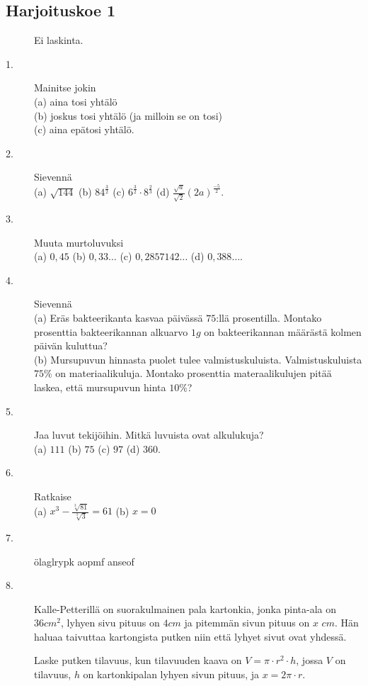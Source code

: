 \subsection*{Harjoituskoe 1}


\begin{description}
	\item[] Ei laskinta.
	\item[1.] Mainitse jokin \\
	(a) aina tosi yhtälö \\
	(b) joskus tosi yhtälö (ja milloin se on tosi) \\
	(c) aina epätosi yhtälö.
	\item[2.] Sievennä \\
	(a) $\sqrt{144}$ \qquad
	(b) $84^\frac{3}{2}$ \qquad
	(c) $ 6^\frac{3}{2}\cdot 8^\frac{2}{3} $ \qquad
	(d) $\frac{\sqrt{a}}{\sqrt{2}}(2a)^{\frac{-5}{2}}$.
	\item[3.] Muuta murtoluvuksi \\
	(a) $0,45$ \qquad
	(b) $0,33\ldots$ \qquad
	(c) $0,2857142\ldots$ \qquad
	(d) $0,388\ldots$.
	\item[4.] Sievennä \\
	(a) Eräs bakteerikanta kasvaa päivässä $75$:llä prosentilla. Montako prosenttia bakteerikannan alkuarvo $1 g$ on bakteerikannan määrästä kolmen päivän kuluttua? \\
	(b) Mursupuvun hinnasta puolet tulee valmistuskuluista. Valmistuskuluista $75\%$ on materiaalikuluja. Montako prosenttia materaalikulujen pitää laskea, että mursupuvun hinta $10\%$? \qquad
	\item[5.] Jaa luvut tekijöihin. Mitkä luvuista ovat alkulukuja? \\
	(a) $111$ \qquad
	(b) $75$ \qquad
	(c) $97$ \qquad
	(d) $360$.
	\item[6.] Ratkaise \\
	(a) $x^3 - \frac{\sqrt[3]{81}}{\sqrt[3]{3}} = 61$ \qquad
	(b) $x=0$
	\item[7.] ölaglrypk aopmf anseof  \\
	\item[8.] Kalle-Petterillä on suorakulmainen pala kartonkia, jonka pinta-ala on $36cm^2$, lyhyen sivu pituus on $4cm$ ja pitemmän sivun pituus on $x$ $cm$. 
	Hän haluaa taivuttaa kartongista putken niin että lyhyet sivut ovat yhdessä. 
	
	Laske putken tilavuus, kun tilavuuden kaava on $V=\pi\cdot r^2\cdot h$, jossa $V$ on tilavuus, $h$ on kartonkipalan lyhyen sivun pituus, ja $x=2\pi\cdot r$.    
\end{description}

